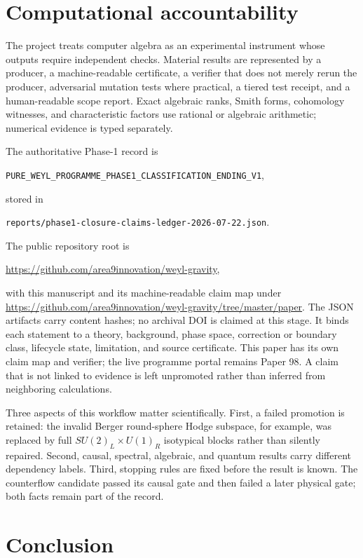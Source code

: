 \documentclass[11pt]{article}
\newcommand{\cert}[1]{\nolinkurl{#1}}
\begin{document}
\section{Computational accountability}

The project treats computer algebra as an experimental instrument whose
outputs require independent checks.  Material results are represented by a
producer, a machine-readable certificate, a verifier that does not merely
rerun the producer, adversarial mutation tests where practical, a tiered test
receipt, and a human-readable scope report.  Exact algebraic ranks, Smith
forms, cohomology witnesses, and characteristic factors use rational or
algebraic arithmetic; numerical evidence is typed separately.

The authoritative Phase-1 record is
\begin{center}
\cert{PURE_WEYL_PROGRAMME_PHASE1_CLASSIFICATION_ENDING_V1},
\end{center}
stored in
\begin{center}
\cert{reports/phase1-closure-claims-ledger-2026-07-22.json}.
\end{center}
The public repository root is
\begin{center}
\url{https://github.com/area9innovation/weyl-gravity},
\end{center}
with this manuscript and its machine-readable claim map under
\url{https://github.com/area9innovation/weyl-gravity/tree/master/paper}.
The JSON artifacts carry content hashes; no archival DOI is claimed at this
stage.
It binds each statement to a theory, background, phase space, correction or
boundary class, lifecycle state, limitation, and source certificate.  This
paper has its own claim map and verifier; the live programme portal remains
Paper 98.  A claim that is not linked to evidence is left unpromoted rather
than inferred from neighboring calculations.

Three aspects of this workflow matter scientifically.  First, a failed
promotion is retained: the invalid Berger round-sphere Hodge subspace, for
example, was replaced by full $SU(2)_L\times U(1)_R$ isotypical blocks rather
than silently repaired.  Second, causal, spectral, algebraic, and quantum
results carry different dependency labels.  Third, stopping rules are fixed
before the result is known.  The counterflow candidate passed its causal gate
and then failed a later physical gate; both facts remain part of the record.

\section{Conclusion}
\end{document}
